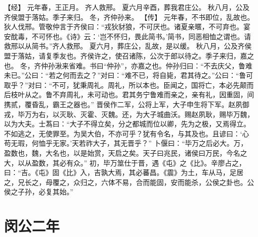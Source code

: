 \documentclass[a4paper,12pt,UTF8,twoside]{ctexbook}
\begin{document}
【经】
元年春，王正月。
齐人救邢。
夏六月辛酉，葬我君庄公。
秋八月，公及齐侯盟于落姑。季子来归。
冬，齐仲孙来。
【传】
元年春，不书即位，乱故也。
狄人伐邢。管敬仲言于齐侯曰：“戎狄豺狼，不可厌也。诸夏亲暱，不可弃也。宴安酖毒，不可怀也。《诗》云：‘岂不怀归，畏此简书。’简书，同恶相恤之谓也。请救邢以从简书。”齐人救邢。
夏六月，葬庄公，乱故，是以缓。
秋八月，公及齐侯盟于落姑，请复季友也。齐侯许之，使召诸陈，公次于郎以待之。季子来归，嘉之也。
冬，齐仲孙湫来省难。书曰“仲孙”，亦嘉之也。仲孙归曰：“不去庆父，鲁难未已。”公曰：“若之何而去之？”对曰：“难不已，将自毙，君其待之。”公曰：“鲁可取乎？”对曰：“不可，犹秉周礼。周礼，所以本也。臣闻之，国将亡，本必先颠而后枝叶从之。鲁不弃周礼，未可动也。君其务宁鲁难而亲之，亲有礼，因重固，间携贰，覆昏乱，霸王之器也。”
晋侯作二军，公将上军，大子申生将下军。赵夙御戎，毕万为右，以灭耿、灭霍、灭魏。还，为大子城曲沃。赐赵夙耿，赐毕万魏，以为大夫。士蒍曰：“大子不得立矣，分之都城而位以卿，先为之极，又焉得立。不如逃之，无使罪至。为吴大伯，不亦可乎？犹有令名，与其及也。且谚曰：‘心苟无瑕，何恤乎无家。’天若祚大子，其无晋乎？”
卜偃曰：“毕万之后必大。万，盈数也，魏，大名也，以是始赏，天启之矣。天子曰兆民，诸侯曰万民，今名之大，以从盈数，其必有众。”
初，毕万筮仕于晋，遇《屯》之《比》。辛廖占之，曰：“吉。《屯》固《比》入，吉孰大焉，其必蕃昌。《震》为土，车从马，足居之，兄长之，母覆之，众归之，六体不易，合而能固，安而能杀，公侯之卦也。公侯之子孙，必复其始。”

\section{闵公二年}
\end{document}

